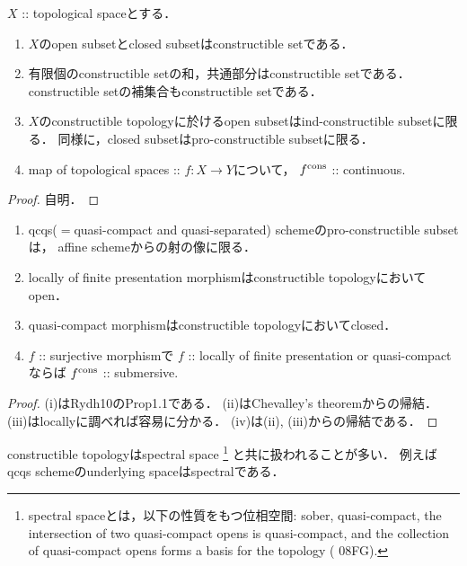 \begin{Prop}
    $X$ :: topological spaceとする．
    \begin{enumerate}
    \item
        $X$のopen subsetとclosed subsetはconstructible setである．

    \item
        有限個のconstructible setの和，共通部分はconstructible setである．
        constructible setの補集合もconstructible setである．

    \item
        $X$のconstructible topologyに於けるopen subsetはind-constructible subsetに限る．
        同様に，closed subsetはpro-constructible subsetに限る．

    \item
        map of topological spaces :: $f \colon X \to Y$について，
        $f^{\mathrm{cons}}$ :: continuous.
    \end{enumerate}
\end{Prop}
\begin{proof}
    自明．   
\end{proof}

\begin{Prop} \label{nontrivial_constop}
    \begin{enumerate}
    \item 
        qcqs($=$quasi-compact and quasi-separated) schemeのpro-constructible subsetは，
        affine schemeからの射の像に限る．

    \item
        locally of finite presentation morphismはconstructible topologyにおいてopen．

    \item
         quasi-compact morphismはconstructible topologyにおいてclosed．

    \item
        $f$ :: surjective morphismで
        $f$ :: locally of finite presentation or quasi-compactならば
        $f^{\mathrm{cons}}$ :: submersive.
    \end{enumerate}
\end{Prop}
\begin{proof}
    (i)はRydh10のProp1.1である．
    (ii)はChevalley's theoremからの帰結．
    (iii)はlocallyに調べれば容易に分かる．
    (iv)は(ii), (iii)からの帰結である．
\end{proof}

\begin{Remark}
    constructible topologyはspectral space
    \footnote
    {
        spectral spaceとは，以下の性質をもつ位相空間:
        sober, quasi-compact,
        the intersection of two quasi-compact opens is quasi-compact,
        and the collection of quasi-compact opens forms a basis for the topology
        (\cite{SP} 08FG).
    }
    と共に扱われることが多い．
    例えばqcqs schemeのunderlying spaceはspectralである．
\end{Remark}

